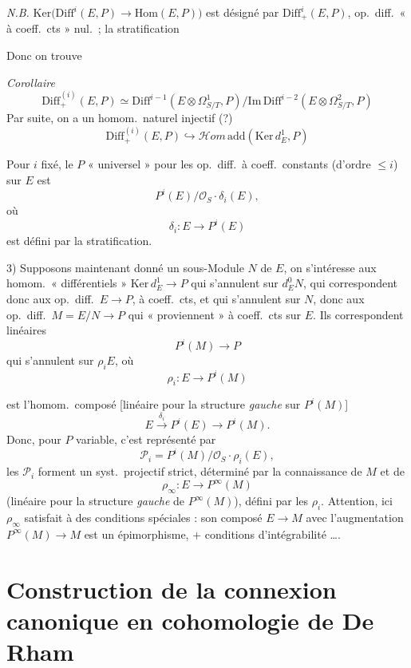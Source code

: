 \documentclass[11pt,a4paper]{article}
\begin{document}
\emph{N.B.} $\mathrm{Ker}\bigl(\mathrm{Diff}^i(E,P) \to \mathrm{Hom}(E,P)\bigr)$
est désigné par $\mathrm{Diff}^i_+(E,P)$, op.\ diff.\ « à coeff.\ cts » nul.\ ;
la stratification

Donc on trouve

\emph{Corollaire}
\[
  \mathrm{Diff}^{(i)}_+(E,P) \simeq
  \mathrm{Diff}^{i-1}(E \otimes \Omega^1_{S/T}, P) /
  \mathrm{Im}\, \mathrm{Diff}^{i-2}(E \otimes \Omega^2_{S/T}, P)
\]
Par suite, on a un homom.\ naturel injectif (?)
\[
  \mathrm{Diff}^{(i)}_+(E,P) \hookrightarrow
  \mathscr{H}\!om\,\mathrm{add}(\mathrm{Ker}\, d^1_E, P)
\]

Pour $i$ fixé, le $P$ « universel » pour les op.\ diff.\ à coeff.\ constants
(d'ordre $\leq i$) sur $E$ est
\[
  P^i(E) / \mathcal{O}_S \cdot \delta_i(E) ,
\]
où
\[
  \delta_i : E \to P^i(E)
\]
est défini par la stratification.

3) Supposons maintenant donné un sous-Module $N$ de $E$, on s'intéresse aux
homom.\ « différentiels » $\mathrm{Ker}\, d^1_E \to P$ qui s'annulent sur
$d^0_E N$, qui correspondent donc aux \struck{\ill{}} op.\ diff.\
$E \to P$, à coeff.\ cts, et qui s'annulent sur $N$, donc aux op.\ diff.\
$M = E/N \to P$ qui  « proviennent » à coeff.\ cts sur
$E$. Ils correspondent \add{(pour l'ordre $\leq i$), aux homom.} linéaires
\[
  P^i(M) \to P
\]
qui s'annulent sur $\rho_i E$, où
\[
  \rho_i : E \to P^i(M)
\]

est l'homom.\ composé [linéaire pour la structure \emph{gauche} sur
$P^i(M)$]
\[
  E \xrightarrow{\delta_i} P^i(E) \to P^i(M) .
\]
Donc, pour $P$ variable, c'est représenté par
\[
  \mathscr{P}_i = P^i(M) / \mathcal{O}_S \cdot \rho_i(E) ,
\]
les $\mathscr{P}_i$ forment un syst.\ projectif strict, déterminé par la
connaissance de $M$ et de
\[
  \rho_\infty : E \to P^\infty(M)
\]
(linéaire pour la structure \emph{gauche} de $P^\infty(M)$), défini par les
$\rho_i$. Attention, ici $\rho_\infty$ satisfait à des conditions spéciales :
son composé $E \to M$ \struck{\ill{}} avec l'augmentation $P^\infty(M) \to M$
est un épimorphisme, + conditions d'intégrabilité ….

\section{Construction de la connexion canonique en cohomologie de De Rham}

\page{233}
\end{document}
